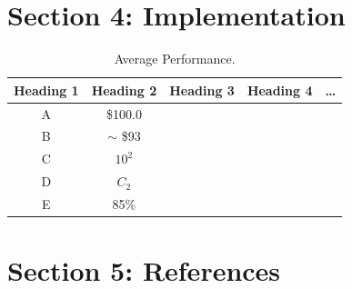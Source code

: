 \documentclass[a4paper]{article} %
\begin{document}
\section*{Section 4: Implementation}\label{sec:section4}



\begin{table}[h!]
    \centering
    \begin{tabular}{|c|c|c|c|c|}
    \hline
        Heading 1 & Heading 2 & Heading 3 & Heading 4 & \ldots \\
    \hline
    A & \$100.0 &&& \\\hline
    B & $\sim$ \$93 &&& \\\hline
    C & $10^2$ &&& \\\hline
    D & $C_2$ &&& \\\hline
    E & 85\% &&& \\\hline
    \end{tabular}
    \label{tab:my_label}
    \caption{Average Performance.}
\end{table}


\section*{Section 5: References}\label{sec:section5}



\end{document}

